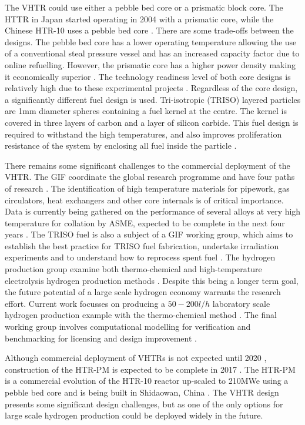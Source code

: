 \documentclass[journal]{IEEEtran}
\begin{document}
The VHTR could use either a pebble bed core or a prismatic block core.
The HTTR in Japan started operating in 2004 with a prismatic core, while the Chinese HTR-10 uses a pebble bed core \cite{Ftterer2014}.
There are some trade-offs between the designs.
The pebble bed core has a lower operating temperature allowing the use of a conventional steal pressure vessel and has an increased capacity factor due to online refuelling.
However, the prismatic core has a higher power density making it economically superior \cite{Locatelli2013}.
The technology readiness level of both core designs is relatively high due to these experimental projects \cite{Ftterer2014}.
Regardless of the core design, a significantly different fuel design is used.
Tri-isotropic (TRISO) layered particles are 1mm diameter spheres containing a fuel kernel at the centre.
The kernel is covered in three layers of carbon and a layer of silicon carbide.
This fuel design is required to withstand the high temperatures, and also improves proliferation resistance of the system by enclosing all fuel inside the particle \cite{Marques2010a}.

There remains some significant challenges to the commercial deployment of the VHTR. 
The GIF coordinate the global research programme and have four paths of research \cite{GenIVForum}.
The identification of high temperature materials for pipework, gas circulators, heat exchangers and other core internals is of critical importance. 
Data is currently being gathered on the performance of several alloys at very high temperature for collation by ASME, expected to be complete in the next four years \cite{Ftterer2014}.
The TRISO fuel is also a subject of a GIF working group, which aims to establish the best practice for TRISO fuel fabrication, undertake irradiation experiments \cite{Ftterer2014} and to understand how to reprocess spent fuel \cite{GenIVForum}. 
The hydrogen production group examine both thermo-chemical and high-temperature electrolysis hydrogen production methods \cite{GenIVForum}.
Despite this being a longer term goal, the future potential of a large scale hydrogen economy warrants the research effort.
Current work focusses on producing a $50-200l/h$ laboratory scale hydrogen production example with the thermo-chemical method \cite{Ftterer2014}.
The final working group involves computational modelling for verification and benchmarking for licensing and design improvement \cite{GenIVForum}.

Although commercial deployment of VHTRs is not expected until 2020 \cite{GenIVRoadmap}, construction of the HTR-PM is expected to be complete in 2017 \cite{Ftterer2014}. 
The HTR-PM is a commercial evolution of the HTR-10 reactor up-scaled to 210MWe using a pebble bed core and is being built in Shidaowan, China \cite{Locatelli2013}.
The VHTR design presents some significant design challenges, but as one of the only options for large scale hydrogen production could be deployed widely in the future.
\end{document}
